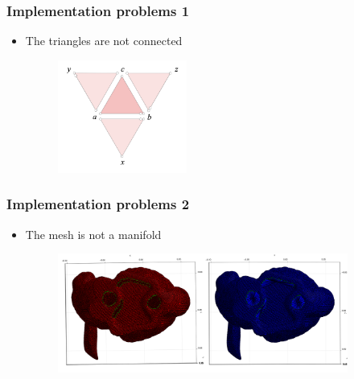 \documentclass{beamer}
\begin{document}
\begin{frame}[t]
    \frametitle{Implementation problems 1}
    \begin{itemize}
        \item The triangles are not connected
            \begin{figure}[h]
                \begin{center}
                    \includegraphics[width=0.4\textwidth]{triangles.png}
                \end{center}
            \end{figure}
    \end{itemize}
\end{frame}
\begin{frame}[t]
    \frametitle{Implementation problems 2}
    \begin{itemize}
        \item The mesh is not a manifold
            \begin{figure}[h]
                \begin{center}
                    \includegraphics[width=0.9\textwidth]{butthole.png}
                \end{center}
            \end{figure}
    \end{itemize}
\end{frame}
\end{document}
